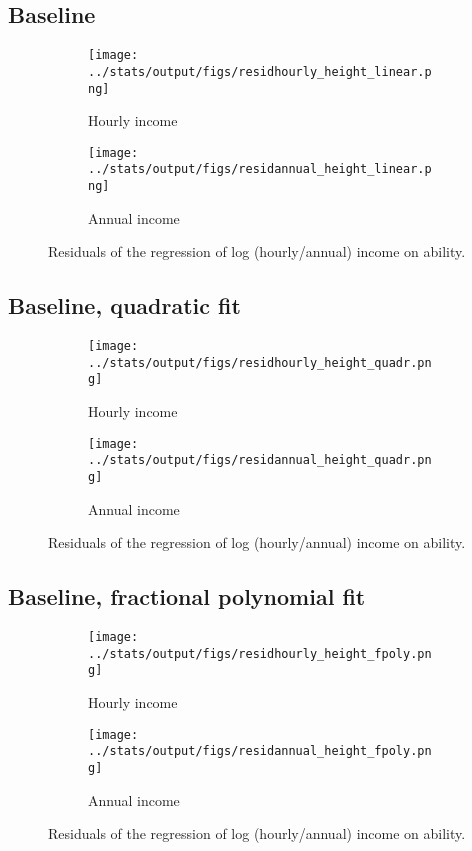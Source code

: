 \subsection{Baseline}
\begin{figure}[htbp]
	\begin{subfigure}[b]{0.9\textwidth}
		\centering
		\texttt{[image: ../stats/output/figs/residhourly\_height\_linear.png]}	
		\label{fig:hourlyresidheight_linear}
		\caption{Hourly income}
	\end{subfigure}
	
	\begin{subfigure}[b]{0.9\textwidth}
		\centering
		\texttt{[image: ../stats/output/figs/residannual\_height\_linear.png]}	
		\label{fig:annualresidheight_linear}
		\caption{Annual income}
	\end{subfigure}
	\caption{Residuals of the regression of log (hourly/annual) income on ability.}
\end{figure}

\clearpage
\subsection{Baseline, quadratic fit}
\begin{figure}[htbp]
	\begin{subfigure}[b]{0.9\textwidth}
		\centering
		\texttt{[image: ../stats/output/figs/residhourly\_height\_quadr.png]}	
		\label{fig:hourlyresidheight_quadr}
		\caption{Hourly income}
	\end{subfigure}
	
	\begin{subfigure}[b]{0.9\textwidth}
		\centering
		\texttt{[image: ../stats/output/figs/residannual\_height\_quadr.png]}	
		\label{fig:annualresidheight_quadr}
		\caption{Annual income}
	\end{subfigure}
	\caption{Residuals of the regression of log (hourly/annual) income on ability.}
\end{figure}

\clearpage
\subsection{Baseline, fractional polynomial fit}
\begin{figure}[htbp]
	\begin{subfigure}[b]{0.9\textwidth}
		\centering
		\texttt{[image: ../stats/output/figs/residhourly\_height\_fpoly.png]}	
		\label{fig:hourlyresidheight_fpoly}
		\caption{Hourly income}
	\end{subfigure}
	
	\begin{subfigure}[b]{0.9\textwidth}
		\centering
		\texttt{[image: ../stats/output/figs/residannual\_height\_fpoly.png]}	
		\label{fig:annualresidheight_fpoly}
		\caption{Annual income}
	\end{subfigure}
	\caption{Residuals of the regression of log (hourly/annual) income on ability.}
\end{figure}

